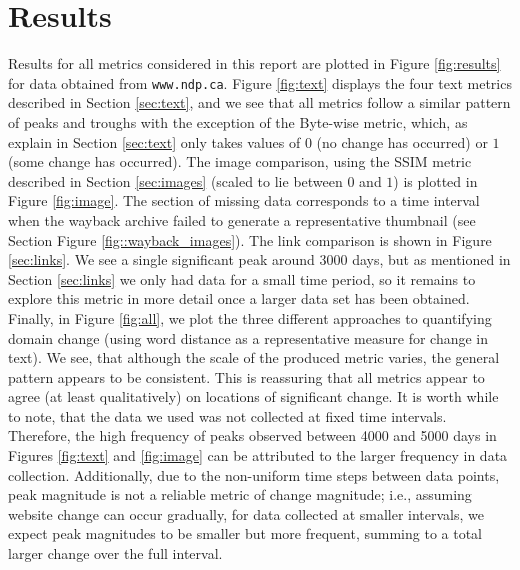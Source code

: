 \documentclass[10pt, a4paper]{article}
\begin{document}
\section{Results}

Results for all metrics considered in this report are plotted in Figure \ref{fig:results} for data obtained from \texttt{www.ndp.ca}. Figure \ref{fig:text} displays the four text metrics described in Section \ref{sec:text}, and we see that all metrics follow a similar pattern of peaks and troughs with the exception of the Byte-wise metric, which, as explain in Section \ref{sec:text} only takes values of $0$ (no change has occurred) or $1$ (some change has occurred). The image comparison, using the SSIM metric described in Section \ref{sec:images} (scaled to lie between $0$ and $1$) is plotted in Figure \ref{fig:image}. The section of missing data corresponds to a time interval when the wayback archive failed to generate a representative thumbnail (see Section Figure \ref{fig::wayback_images}). The link comparison is shown in Figure \ref{sec:links}. We see a single significant peak around 3000 days, but as mentioned in Section \ref{sec:links} we only had data for a small time period, so it remains to explore this metric in more detail once a larger data set has been obtained. Finally, in Figure \ref{fig:all}, we plot the three different approaches to quantifying domain change (using word distance as a representative measure for change in text). We see, that although the scale of the produced metric varies, the general pattern appears to be consistent. This is reassuring that all metrics appear to agree (at least qualitatively) on locations of significant change. It is worth while to note, that the data we used was not collected at fixed time intervals. Therefore, the high frequency of peaks observed between 4000 and 5000 days in Figures \ref{fig:text} and \ref{fig:image} can be attributed to the larger frequency in data collection. Additionally, due to the non-uniform time steps between data points, peak magnitude is not a reliable metric of change magnitude; i.e., assuming website change can occur gradually, for data collected at smaller intervals, we expect peak magnitudes to be smaller but more frequent, summing to a total larger change over the full interval. 
\end{document}
